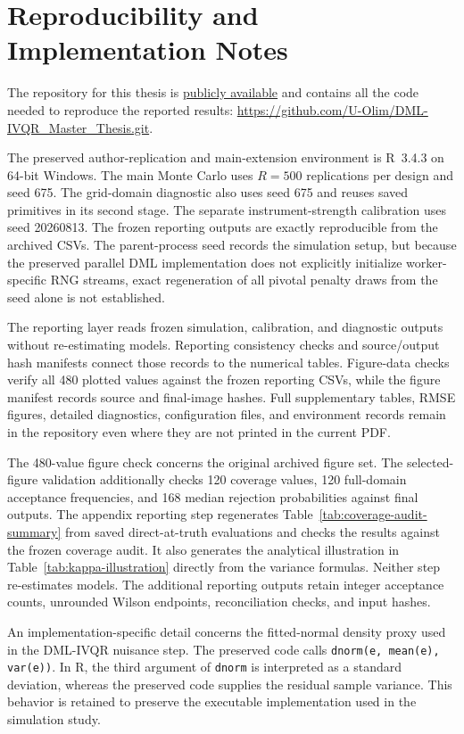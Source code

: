 \section{Reproducibility and Implementation Notes}
\label{app:reproducibility}

The repository for this thesis is \href{https://github.com/U-Olim/DML-IVQR_Master_Thesis.git}{publicly available} and contains all the code needed to reproduce the reported results: \url{https://github.com/U-Olim/DML-IVQR_Master_Thesis.git}.

The preserved author-replication and main-extension environment is R~3.4.3 on 64-bit Windows. The main Monte Carlo uses $R=500$ replications per design and seed 675. The grid-domain diagnostic also uses seed 675 and reuses saved primitives in its second stage. The separate instrument-strength calibration uses seed 20260813. The frozen reporting outputs are exactly reproducible from the archived CSVs. The parent-process seed records the simulation setup, but because the preserved parallel DML implementation does not explicitly initialize worker-specific RNG streams, exact regeneration of all pivotal penalty draws from the seed alone is not established.

The reporting layer reads frozen simulation, calibration, and diagnostic outputs without re-estimating models. Reporting consistency checks and source/output hash manifests connect those records to the numerical tables. Figure-data checks verify all 480 plotted values against the frozen reporting CSVs, while the figure manifest records source and final-image hashes. Full supplementary tables, RMSE figures, detailed diagnostics, configuration files, and environment records remain in the repository even where they are not printed in the current PDF.

The 480-value figure check concerns the original archived figure set. The selected-figure validation additionally checks 120 coverage values, 120 full-domain acceptance frequencies, and 168 median rejection probabilities against final outputs. The appendix reporting step regenerates Table~\ref{tab:coverage-audit-summary} from saved direct-at-truth evaluations and checks the results against the frozen coverage audit. It also generates the analytical illustration in Table~\ref{tab:kappa-illustration} directly from the variance formulas. Neither step re-estimates models. The additional reporting outputs retain integer acceptance counts, unrounded Wilson endpoints, reconciliation checks, and input hashes.

An implementation-specific detail concerns the fitted-normal density proxy used in the DML-IVQR nuisance step. The preserved code calls \texttt{dnorm(e, mean(e), var(e))}. In R, the third argument of \texttt{dnorm} is interpreted as a standard deviation, whereas the preserved code supplies the residual sample variance. This behavior is retained to preserve the executable implementation used in the simulation study.
